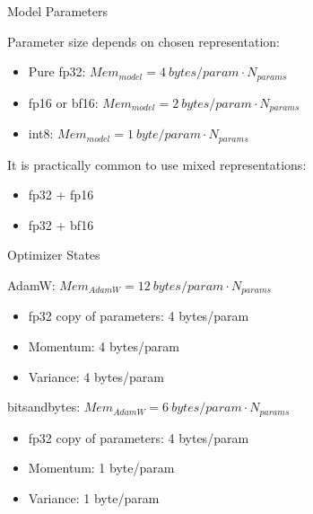 
\begin{vbframe}{Model Parameters}

\vfill

Parameter size depends on chosen representation: \newline

\begin{itemize}
 	\item Pure fp32: $Mem_{model} = 4 ~bytes/param \cdot N_{params}$
 	\item fp16 or bf16: $Mem_{model} = 2 ~bytes/param \cdot N_{params}$
	\item int8: $Mem_{model} = 1 ~byte/param \cdot N_{params}$
\end{itemize}

\vskip8mm

It is practically common to use mixed representations: \newline

\begin{itemize}
 	\item fp32 + fp16
	\item fp32 + bf16
\end{itemize}

\vfill

\end{vbframe}


\begin{vbframe}{Optimizer States}

\vfill

AdamW: $Mem_{AdamW} = 12 ~bytes/param \cdot N_{params}$
\begin{itemize}
 	\item fp32 copy of parameters: 4 bytes/param
 	\item Momentum: 4 bytes/param
	\item Variance: 4 bytes/param
\end{itemize}

\vskip3mm

bitsandbytes: $Mem_{AdamW} = 6 ~bytes/param \cdot N_{params}$
\begin{itemize}
 	\item fp32 copy of parameters: 4 bytes/param
 	\item Momentum: 1 byte/param
	\item Variance: 1 byte/param
\end{itemize}

%

\vfill

\end{vbframe}

